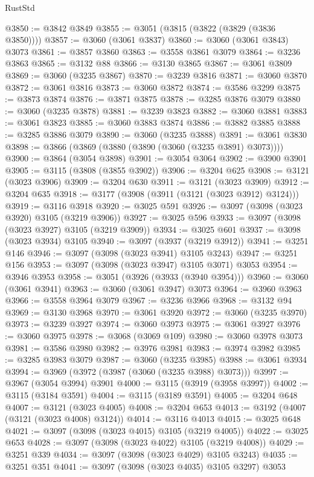 \begin{lexlean}{RustStd}
\begin{coremodule}
{\begin{coremodule}
{{{{{{{{{{{{{{{{{{{{{{{{{{{{{{{{@3850 := @3842 @3849
@3855 := @3051 (@3815 (@3822 (@3829 (@3836 @3850))))
@3857 := @3060 (@3061 @3837)
@3860 := @3060 (@3061 @3843) @3073
@3861 := @3857 @3860
@3863 := @3558 @3861 @3079
@3864 := @3236 @3863
@3865 := @3132 @88
@3866 := @3130 @3865
@3867 := @3061 @3809
@3869 := @3060 (@3235 @3867)
@3870 := @3239 @3816
@3871 := @3060 @3870
@3872 := @3061 @3816
@3873 := @3060 @3872
@3874 := @3586 @3299
@3875 := @3873 @3874
@3876 := @3871 @3875
@3878 := @3285 @3876 @3079
@3880 := @3060 (@3235 @3878)
@3881 := @3239 @3823
@3882 := @3060 @3881
@3883 := @3061 @3823
@3885 := @3060 @3883 @3874
@3886 := @3882 @3885
@3888 := @3285 @3886 @3079
@3890 := @3060 (@3235 @3888)
@3891 := @3061 @3830
@3898 := @3866 (@3869 (@3880 (@3890 (@3060 (@3235 @3891) @3073))))
@3900 := @3864 (@3054 @3898)
@3901 := @3054 @3064
@3902 := @3900 @3901
@3905 := @3115 (@3808 (@3855 @3902))
@3906 := @3204 @625
@3908 := @3121 (@3023 @3906)
@3909 := @3204 @630
@3911 := @3121 (@3023 @3909)
@3912 := @3204 @635
@3918 := @3177 (@3908 (@3911 (@3121 (@3023 @3912) @3124)))
@3919 := @3116 @3918
@3920 := @3025 @591
@3926 := @3097 (@3098 (@3023 @3920) @3105 (@3219 @3906))
@3927 := @3025 @596
@3933 := @3097 (@3098 (@3023 @3927) @3105 (@3219 @3909))
@3934 := @3025 @601
@3937 := @3098 (@3023 @3934) @3105
@3940 := @3097 (@3937 (@3219 @3912))
@3941 := @3251 @146
@3946 := @3097 (@3098 (@3023 @3941) @3105 @3243)
@3947 := @3251 @156
@3953 := @3097 (@3098 (@3023 @3947) @3105 @3071) @3053
@3954 := @3946 @3953
@3958 := @3051 (@3926 (@3933 (@3940 @3954)))
@3960 := @3060 (@3061 @3941)
@3963 := @3060 (@3061 @3947) @3073
@3964 := @3960 @3963
@3966 := @3558 @3964 @3079
@3967 := @3236 @3966
@3968 := @3132 @94
@3969 := @3130 @3968
@3970 := @3061 @3920
@3972 := @3060 (@3235 @3970)
@3973 := @3239 @3927
@3974 := @3060 @3973
@3975 := @3061 @3927
@3976 := @3060 @3975
@3978 := @3068 (@3069 @109)
@3980 := @3060 @3978 @3073
@3981 := @3586 @3980
@3982 := @3976 @3981
@3983 := @3974 @3982
@3985 := @3285 @3983 @3079
@3987 := @3060 (@3235 @3985)
@3988 := @3061 @3934
@3994 := @3969 (@3972 (@3987 (@3060 (@3235 @3988) @3073)))
@3997 := @3967 (@3054 @3994) @3901
@4000 := @3115 (@3919 (@3958 @3997))
@4002 := @3115 (@3184 @3591)
@4004 := @3115 (@3189 @3591)
@4005 := @3204 @648
@4007 := @3121 (@3023 @4005)
@4008 := @3204 @653
@4013 := @3192 (@4007 (@3121 (@3023 @4008) @3124))
@4014 := @3116 @4013
@4015 := @3025 @648
@4021 := @3097 (@3098 (@3023 @4015) @3105 (@3219 @4005))
@4022 := @3025 @653
@4028 := @3097 (@3098 (@3023 @4022) @3105 (@3219 @4008))
@4029 := @3251 @339
@4034 := @3097 (@3098 (@3023 @4029) @3105 @3243)
@4035 := @3251 @351
@4041 := @3097 (@3098 (@3023 @4035) @3105 @3297) @3053
}}}}}}}}}}}}}}}}}}}}}}}}}}}}}}}}
\end{coremodule}}
\end{coremodule}
\end{lexlean}
